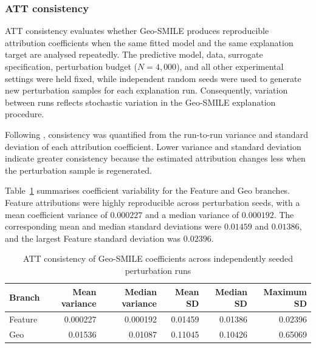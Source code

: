 \subsubsection{ATT consistency}
\label{sec:hull_att_consistency}

ATT consistency evaluates whether Geo-SMILE produces reproducible attribution coefficients when the same fitted model and the same explanation target are analysed repeatedly. The predictive model, data, surrogate specification, perturbation budget ($N=4{,}000$), and all other experimental settings were held fixed, while independent random seeds were used to generate new perturbation samples for each explanation run. Consequently, variation between runs reflects stochastic variation in the Geo-SMILE explanation procedure.

Following \citet{dehghani_smile_thesis}, consistency was quantified from the run-to-run variance and standard deviation of each attribution coefficient. Lower variance and standard deviation indicate greater consistency because the estimated attribution changes less when the perturbation sample is regenerated.






Table~\ref{tab:hull_consistency_variance} summarises coefficient variability for the Feature and Geo branches. Feature attributions were highly reproducible across perturbation seeds, with a mean coefficient variance of $0.000227$ and a median variance of $0.000192$. The corresponding mean and median standard deviations were $0.01459$ and $0.01386$, and the largest Feature standard deviation was $0.02396$.

\begin{table}[H]
\centering
\caption{ATT consistency of Geo-SMILE coefficients across independently
seeded perturbation runs}
\label{tab:hull_consistency_variance}
\small
\begin{tabular}{l|rrrrr}
\toprule
Branch &
Mean variance &
Median variance &
Mean SD &
Median SD &
Maximum SD \\
\midrule
Feature &
0.000227 &
0.000192 &
0.01459 &
0.01386 &
0.02396 \\
Geo &
0.01536 &
0.01087 &
0.11045 &
0.10426 &
0.65069 \\
\bottomrule
\end{tabular}
\end{table}

